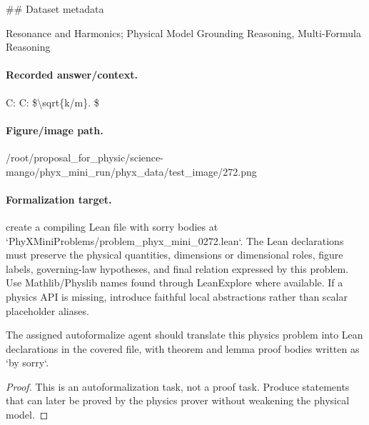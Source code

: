 \#\# Dataset metadata

Resonance and Harmonics; Physical Model Grounding Reasoning, Multi-Formula Reasoning

\paragraph{Recorded answer/context.}
C: C: \$\textbackslash{}sqrt\{k/m\}. \$

\paragraph{Figure/image path.}
/root/proposal\_for\_physic/science-mango/phyx\_mini\_run/phyx\_data/test\_image/272.png

\paragraph{Formalization target.}
create a compiling Lean file with sorry bodies at `PhyXMiniProblems/problem\_phyx\_mini\_0272.lean`. The Lean declarations must preserve the physical quantities, dimensions or dimensional roles, figure labels, governing-law hypotheses, and final relation expressed by this problem.
Use Mathlib/Physlib names found through LeanExplore where available. If a physics API is missing, introduce faithful local abstractions rather than scalar placeholder aliases.

\begin{theorem}
\label{thm:physics:phyx_mini_0272:target}
The assigned autoformalize agent should translate this physics problem into Lean declarations in the covered file, with theorem and lemma proof bodies written as `by sorry`.
\end{theorem}
\begin{proof}
This is an autoformalization task, not a proof task. Produce statements that can later be proved by the physics prover without weakening the physical model.
\end{proof}

